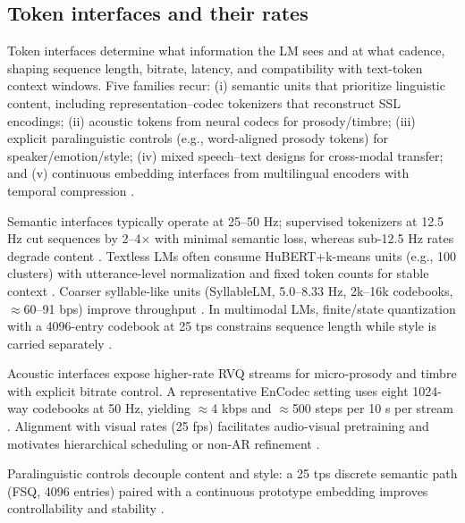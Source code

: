 \documentclass{article}
\begin{document}
\subsection{Token interfaces and their rates} \label{subsec:Token interfaces and their rates}
Token interfaces determine what information the LM sees and at what cadence, shaping sequence length, bitrate, latency, and compatibility with text-token context windows. Five families recur: (i) semantic units that prioritize linguistic content, including representation--codec tokenizers that reconstruct SSL encodings; (ii) acoustic tokens from neural codecs for prosody/timbre; (iii) explicit paralinguistic controls (e.g., word-aligned prosody tokens) for speaker/emotion/style; (iv) mixed speech--text designs for cross-modal transfer; and (v) continuous embedding interfaces from multilingual encoders with temporal compression \cite{qian2025prosodylmuncoveringemergingprosodyproces,fily2024establishingdegreesclosenessbetweenaudio,entry2025towardjointlanguagemodelingspeechunitste,huang2024repcodecspeechrepresentationcodectokeniz}.

Semantic interfaces typically operate at 25--50 Hz; supervised tokenizers at 12.5 Hz cut sequences by 2--4$\times$ with minimal semantic loss, whereas sub-12.5 Hz rates degrade content \cite{zeng2024scalingspeechtextpretrainingsyntheticint}. Textless LMs often consume HuBERT+k-means units (e.g., 100 clusters) with utterance-level normalization and fixed token counts for stable context \cite{hsu2024exploringcontextlearningtextlessspeechla}. Coarser syllable-like units (SyllableLM, 5.0--8.33 Hz, 2k--16k codebooks, $\approx$60--91 bps) improve throughput \cite{baade2024syllablelmlearningcoarsesemanticunitsspe}. In multimodal LMs, finite/state quantization with a 4096-entry codebook at 25 tps constrains sequence length while style is carried separately \cite{chen2025emovaempoweringlanguagemodelsseehearspea}.

Acoustic interfaces expose higher-rate RVQ streams for micro-prosody and timbre with explicit bitrate control. A representative EnCodec setting uses eight 1024-way codebooks at 50 Hz, yielding $\approx$4 kbps and $\approx$500 steps per 10 s per stream \cite{peng2024mslms2stmultitaskspeechlanguagemodeltext}. Alignment with visual rates (25 fps) facilitates audio-visual pretraining and motivates hierarchical scheduling or non-AR refinement \cite{sadok2025vectorquantizedmaskedautoencoderaudiovis,peng2024mslms2stmultitaskspeechlanguagemodeltext}.

Paralinguistic controls decouple content and style: a 25 tps discrete semantic path (FSQ, 4096 entries) paired with a continuous prototype embedding improves controllability and stability \cite{chen2025emovaempoweringlanguagemodelsseehearspea}.
\end{document}
